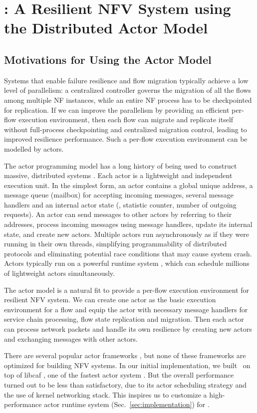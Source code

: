 \chapter {\nfactor: A Resilient NFV System using the Distributed Actor Model}
\label{ch:nfvactor}

\section{Motivations for Using the Actor Model}

Systems that enable failure resilience \cite{sherry2015rollback,rajagopalan2013pico} and flow migration \cite{rajagopalan2013split, gember2015opennf} typically achieve a low level of parallelism: a centralized controller governs the migration of all the flows among multiple NF instances, while an entire NF process has to be checkpointed for replication. If we can improve the parallelism by providing an efficient per-flow execution environment, then each flow can migrate and replicate itself without full-process checkpointing and centralized migration control, leading to improved resilience performance. Such a per-flow execution environment can be modelled by actors.

The actor programming model \cite{actor-wiki, erlang, akka, caf} has a long history of being used to construct massive, distributed systems \cite{actor-wiki, akka, newell2016optimizing, AnalysisActor}. Each actor is a lightweight and independent execution unit. In the simplest form, an actor contains a global unique address, a message queue (mailbox) for accepting incoming messages, several message handlers and an internal actor state (\eg, statistic counter, number of outgoing requests). An actor can send messages to other actors by referring to their addresses, process incoming messages using message handlers, update its internal state, and create new actors. Multiple actors run asynchronously as if they were running in their own threads, simplifying programmability of distributed protocols and eliminating potential race conditions that may cause system crash. Actors typically run on a powerful runtime system \cite{caf}, which can schedule millions of lightweight actors simultaneously.

The actor model is a natural fit to provide a per-flow execution environment for resilient NFV system. We can create one actor as the basic execution environment for a flow and equip the actor with necessary message handlers for service chain processing, flow state replication and migration. Then each actor can process network packets and handle its own resilience by creating new actors and exchanging messages with other actors.

There are several popular actor frameworks \cite{akka, erlang, Orleans, caf}, but none of these frameworks are optimized for building NFV systems. In our initial implementation, we built \nfactor~on top of libcaf \cite{caf}, one of the fastest actor system \cite{chs-rapc-16}. But the overall performance turned out to be less than satisfactory, due to its actor scheduling strategy and the use of kernel networking stack. This inspires us to customize a high-performance actor runtime system (Sec.~\ref{sec:implementation}) for \nfactor.
